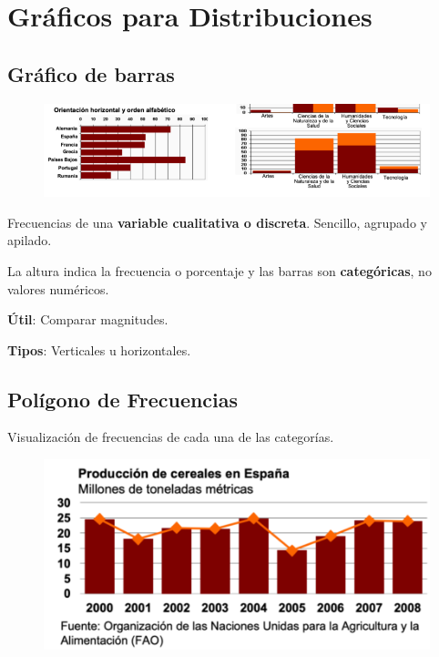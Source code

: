 \documentclass[12pt, twoside, openright]{report} %
\begin{document}
\section{Gráficos para
  Distribuciones}

\subsection{Gráfico de barras}

\begin{figure}[H]
	{\includegraphics[scale=.5]{Untitled 5.png}}
\end{figure}

Frecuencias de una \textbf{variable cualitativa o discreta}. Sencillo,
agrupado y apilado.

La altura indica la frecuencia o porcentaje y las barras son
\textbf{categóricas}, no valores numéricos.

\textbf{Útil}: Comparar magnitudes.

\textbf{Tipos}: Verticales u horizontales.

\subsection{Polígono de
	Frecuencias}

Visualización de frecuencias de cada una de las categorías.
\begin{figure}[H]
	{\includegraphics[scale=.5]{Untitled 6.png}}
\end{figure}
\end{document}
